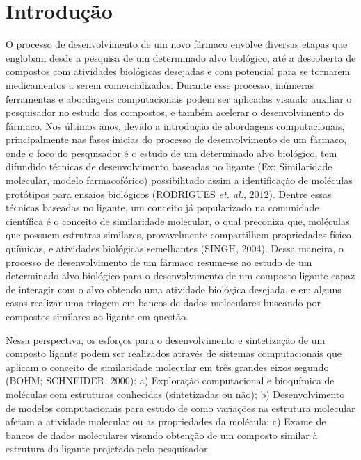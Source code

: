 \chapter{Introdu\c{c}\~ao}
O processo de desenvolvimento \cite{Kopka2003} de um novo fármaco envolve diversas etapas que englobam desde a pesquisa de um determinado alvo biológico, até a descoberta de compostos com atividades biológicas desejadas e com potencial para se tornarem medicamentos a serem comercializados. Durante esse processo, inúmeras ferramentas e abordagens computacionais podem ser aplicadas visando auxiliar o pesquisador no estudo dos compostos, e também acelerar o desenvolvimento do fármaco. Nos últimos anos, devido a introdução de abordagens computacionais, principalmente nas fases inicias do processo de desenvolvimento de um fármaco, onde o foco do pesquisador é o estudo de um determinado alvo biológico,  tem difundido técnicas de desenvolvimento baseadas no ligante (Ex: Similaridade molecular, modelo farmacofórico) possibilitado assim a identificação de moléculas protótipos para ensaios biológicos (RODRIGUES {\it et. al.}, 2012). Dentre essas técnicas baseadas no ligante, um conceito já popularizado na comunidade científica é o conceito de similaridade molecular, o qual preconiza que, moléculas que possuem estrutras similares, provavelmente compartilhem propriedades físico-químicas, e atividades biológicas semelhantes (SINGH, 2004). Dessa maneira, o processo de desenvolvimento de um fármaco resume-se ao estudo de um determinado alvo biológico para o desenvolvimento de um composto ligante capaz de interagir com o alvo obtendo uma atividade biológica desejada, e em alguns casos realizar uma triagem em bancos de dados moleculares buscando por compostos similares ao ligante em questão.

Nessa perspectiva, os esforços para o desenvolvimento e sintetização de um composto ligante podem ser realizados através de sistemas computacionais que aplicam o conceito de similaridade molecular em três grandes eixos segundo (BOHM; SCHNEIDER, 2000): a) Exploração computacional e bioquímica de moléculas com estruturas conhecidas (sintetizadas ou não); b) Desenvolvimento de modelos computacionais para estudo de como variações na estrutura molecular afetam a atividade molecular ou as propriedades da molécula; c) Exame de bancos de dados moleculares visando obtenção de um composto similar à estrutura do ligante projetado pelo pesquisador. 

